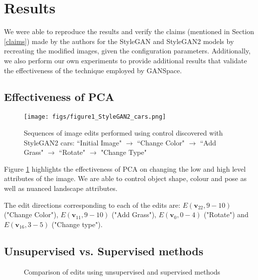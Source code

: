 \section{Results}

We were able to reproduce the results and verify the claims (mentioned in Section \ref{claims}) made by the authors for the StyleGAN and StyleGAN2 models by recreating the modified images, given the configuration parameters. Additionally, we also perform our own experiments to provide additional results that validate the effectiveness of the technique employed by GANSpace.


\subsection{Effectiveness of PCA}

\begin{figure}[H]
    \centering
    \texttt{[image: figs/figure1\_StyleGAN2\_cars.png]}
    \caption{Sequences of image edits performed using control discovered with StyleGAN2 cars: ``Initial Image" $\rightarrow$ ``Change Color" $\rightarrow$ ``Add Grass" $\rightarrow$ ``Rotate" $\rightarrow$ "Change Type"}
    \label{fig:cars}
\end{figure}

Figure \ref{fig:cars} highlights the effectiveness of PCA on changing the low and high level attributes of the image. We are able to control object shape, colour and pose as well as nuanced landscape attributes.

The edit directions corresponding to each of the edits are: $E(\textbf{v}_{22}, 9-10)$ ("Change Color"), $E(\textbf{v}_{11}, 9-10)$ ("Add Grass"), $E(\textbf{v}_{0}, 0-4)$ ("Rotate") and $E(\textbf{v}_{16}, 3-5)$ ("Change type").

\subsection{Unsupervised vs. Supervised methods}

\begin{figure}[H]


  
  \caption{Comparison of edits using unsupervised and supervised methods}
  \label{fig:faces}
\end{figure}

